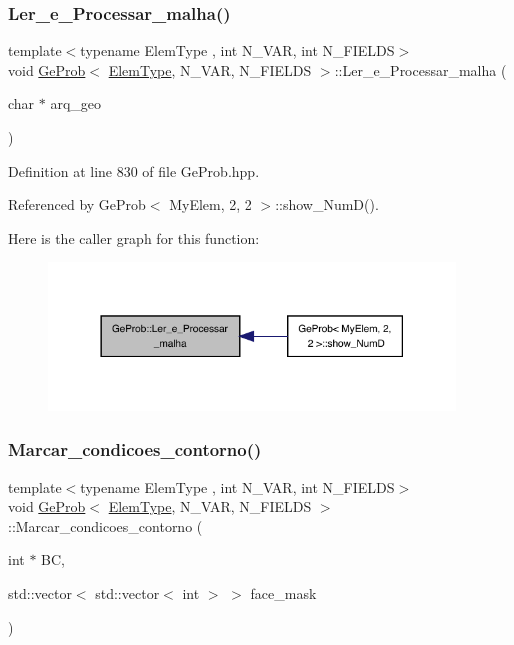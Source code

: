 \subsubsection{\texorpdfstring{Ler\+\_\+e\+\_\+\+Processar\+\_\+malha()}{Ler\_e\_Processar\_malha()}}
{\footnotesize\ttfamily template$<$typename Elem\+Type , int N\+\_\+\+V\+AR, int N\+\_\+\+F\+I\+E\+L\+DS$>$ \\
void \hyperlink{classGeProb}{Ge\+Prob}$<$ \hyperlink{spectral_8h_aaa2c1a7b2d1b12c590d730fe6ac839fa}{Elem\+Type}, N\+\_\+\+V\+AR, N\+\_\+\+F\+I\+E\+L\+DS $>$\+::Ler\+\_\+e\+\_\+\+Processar\+\_\+malha (\begin{DoxyParamCaption}\item[{char $\ast$}]{arq\+\_\+geo }\end{DoxyParamCaption})}



Definition at line 830 of file Ge\+Prob.\+hpp.



Referenced by Ge\+Prob$<$ My\+Elem, 2, 2 $>$\+::show\+\_\+\+Num\+D().

Here is the caller graph for this function\+:
\nopagebreak
\begin{figure}[H]
\begin{center}
\leavevmode
\includegraphics[width=306pt]{classGeProb_ac1030cadfbc0d88e817617a927dbc31f_icgraph}
\end{center}
\end{figure}
\mbox{\label{classGeProb_a6fc2ba08f7556408bd9082ed34ada7bd}} 
\subsubsection{\texorpdfstring{Marcar\+\_\+condicoes\+\_\+contorno()}{Marcar\_condicoes\_contorno()}}
{\footnotesize\ttfamily template$<$typename Elem\+Type , int N\+\_\+\+V\+AR, int N\+\_\+\+F\+I\+E\+L\+DS$>$ \\
void \hyperlink{classGeProb}{Ge\+Prob}$<$ \hyperlink{spectral_8h_aaa2c1a7b2d1b12c590d730fe6ac839fa}{Elem\+Type}, N\+\_\+\+V\+AR, N\+\_\+\+F\+I\+E\+L\+DS $>$\+::Marcar\+\_\+condicoes\+\_\+contorno (\begin{DoxyParamCaption}\item[{int $\ast$}]{BC,  }\item[{std\+::vector$<$ std\+::vector$<$ int $>$ $>$}]{face\+\_\+mask }\end{DoxyParamCaption})}



